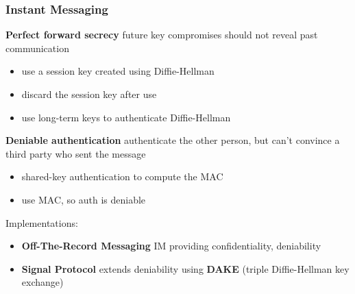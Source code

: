 \documentclass[]{article}
\theoremstyle{definition}
\begin{document}
	\subsubsection{Instant Messaging}
	\textbf{Perfect forward secrecy} future key compromises should not reveal past communication
	\begin{itemize}
		\item use a session key created using Diffie-Hellman
		\item discard the session key after use
		\item use long-term keys to authenticate Diffie-Hellman
	\end{itemize}
	\textbf{Deniable authentication} authenticate the other person, but can't convince a third party who sent the message
	\begin{itemize}
		\item shared-key authentication to compute the MAC
		\item use MAC, so auth is deniable
	\end{itemize}
	Implementations:
	\begin{itemize}
		\item \textbf{Off-The-Record Messaging} IM providing confidentiality, deniability
		\item \textbf{Signal Protocol} extends deniability using \textbf{DAKE} (triple Diffie-Hellman key exchange)
	\end{itemize}
\end{document}
